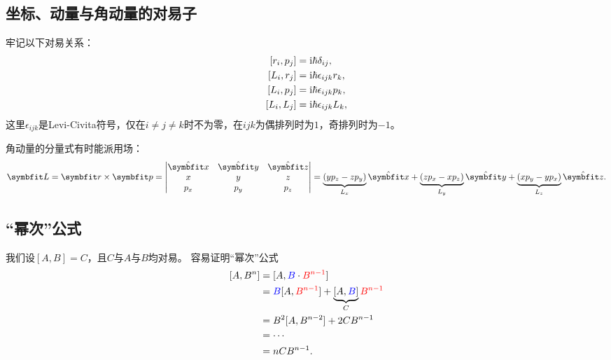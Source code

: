 \subsection{坐标、动量与角动量的对易子}

牢记以下对易关系：
\begin{equation}
\begin{aligned}
    \relax
    [r_i, p_j] &= \mathrm{i}\hbar\delta_{ij}, \\
	[L_i, r_j] &= \mathrm{i}\hbar\epsilon_{ijk} r_k, \\
    [L_i, p_j] &= \mathrm{i}\hbar\epsilon_{ijk} p_k, \\
    [L_i, L_j] &= \mathrm{i}\hbar\epsilon_{ijk} L_k,
\end{aligned}
\end{equation}
这里$\epsilon_{ijk}$是Levi-Civita符号，仅在$i\ne j\ne k$时不为零，在$ijk$为偶排列时为$1$，奇排列时为$-1$。

角动量的分量式有时能派用场：
\begin{equation}
    \LL = \rr\times\pp =
    \begin{vmatrix}
        \hat{\bm{x}} & \hat{\bm{y}} & \hat{\bm{z}} \\
        x & y & z \\
        p_x & p_y & p_z \\
    \end{vmatrix}
    = \underbrace{(y p_z - z p_y)}_{L_x} \hat{\bm{x}} + \underbrace{(z p_x - x p_z)}_{L_y} \hat{\bm{y}} + \underbrace{(x p_y - y p_x)}_{L_z} \hat{\bm{z}}.
\end{equation}

\subsection{``幂次''公式}

我们设$[A, B] = C$，且$C$与$A$与$B$均对易。
容易证明``幂次''公式
\begin{equation}
\begin{aligned}
    \relax
    [A,B^n]
    &= [A,\textcolor{blue}{B}\cdot \textcolor{red}{B^{n-1}}] \\
    &= \textcolor{blue}{B} [A, \textcolor{red}{B^{n-1}}] + \underbrace{[A, \textcolor{blue}{B}]}_C \textcolor{red}{B^{n-1}} \\
    &= B^2 [A, B^{n-2}] + 2C B^{n-1} \\
    &= \cdots \\
    &= n C B^{n-1}.
\end{aligned}
\end{equation}

